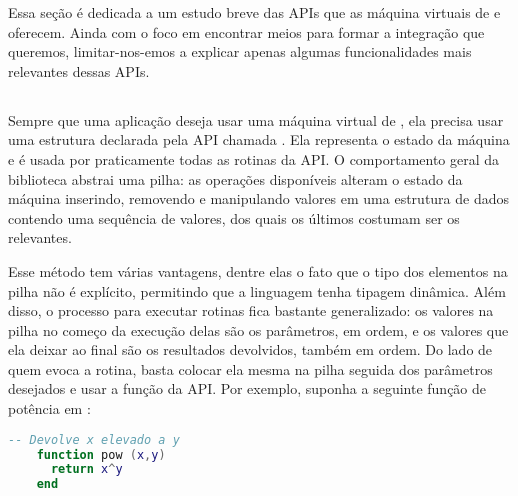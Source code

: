     Essa seção é dedicada a um estudo breve das APIs que as máquina virtuais de
     e  oferecem. Ainda com o foco em encontrar meios
    para formar a integração que queremos, limitar-nos-emos a explicar apenas
    algumas funcionalidades mais relevantes dessas APIs.

    \subsection{}
    \label{cap:conceitos:apis:lua}

      Sempre que uma aplicação deseja usar uma máquina virtual de ,
      ela precisa usar uma estrutura declarada pela API chamada
      . Ela representa o estado da máquina e é usada por
      praticamente todas as rotinas da API. O comportamento geral da biblioteca
      abstrai uma pilha: as operações disponíveis alteram o estado da máquina
      inserindo, removendo e manipulando valores em uma estrutura de dados
      contendo uma sequência de valores, dos quais os últimos costumam ser os
      relevantes\footnotemark{}.


      Esse método tem várias vantagens, dentre elas o fato que o tipo dos
      elementos na pilha não é explícito, permitindo que a linguagem tenha
      tipagem dinâmica. Além disso, o processo para executar
      rotinas fica bastante generalizado: os valores na pilha no começo da
      execução delas são os parâmetros, em ordem, e os valores que ela deixar ao
      final são os resultados devolvidos, também em ordem. Do lado de quem evoca
      a rotina, basta colocar ela mesma na pilha seguida dos parâmetros
      desejados e usar a função  da API. Por exemplo, suponha
      a seguinte função de potência em :
      
      \vspace{1em}

    \begin{lstlisting}[language=lua]
    -- Devolve x elevado a y
    function pow (x,y)
      return x^y
    end
    \end{lstlisting}
      
      \vspace{1em}

